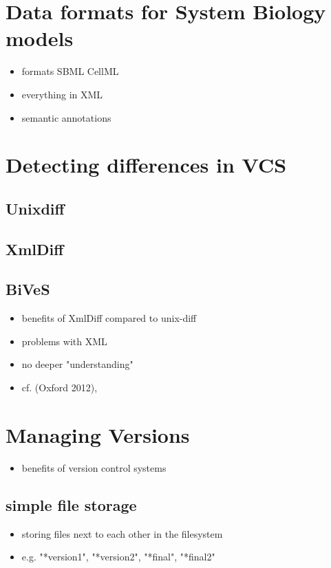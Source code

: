 \section{Data formats for System Biology models}
\begin{itemize}
	\item formats
	\subitem SBML
	\subitem CellML
	\subitem \sedml
	\item everything in XML
	\item semantic annotations
\end{itemize}

\section{Detecting differences in VCS}
\subsection{Unixdiff}
\subsection{XmlDiff}
\subsection{BiVeS}
\begin{itemize}
	\item benefits of XmlDiff compared to unix-diff
	\item problems with XML
	\item no deeper "understanding"
	\item cf. \cite{Waltemath2013} (Oxford 2012), \cite{Scharm2015}
\end{itemize}

\section{Managing Versions}
\begin{itemize}
\item benefits of version control systems
	\subitem \todo[elloborate]
\end{itemize}

	\subsection{simple file storage}
	\begin{itemize}
	\item storing files next to each other in the filesystem
	\item e.g. "*version1", "*version2", "*final", "*final2"
	\end{itemize}
	
